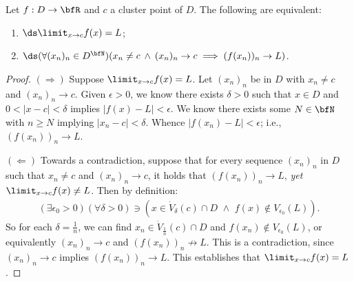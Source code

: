     \begin{proposition}\label{prop:seq-char-of-lim}
        Let $f:D \rightarrow \bfR$ and $c$ a cluster point of $D$. The following are equivalent:
            \begin{enumerate}[label = (\arabic*)]
                \item $\ds \limit_{x \rightarrow c}f(x) = L$;
                \item $\ds (\forall (x_n)_n \in D^\bfN)(x_n \neq c \hspace{2pt}\land\hspace{2pt}(x_n)_n \rightarrow c \implies (f(x_n))_n \rightarrow L)$.
            \end{enumerate}
    \end{proposition}
        \begin{proof}
            $(\Rightarrow)$ Suppose $\limit_{x \rightarrow c}f(x) = L$. Let $(x_n)_n$ be in $D$ with $x_n \neq c$ and $(x_n)_n \rightarrow c$. Given $\epsilon > 0$, we know there exists $\delta > 0$ such that $x \in D$ and $0 < |x-c| < \delta$ implies $|f(x)-L| < \epsilon$. We know there exists some $N \in \bfN$ with $n\geq N$ implying $|x_n - c| < \delta$. Whence $|f(x_n) - L| < \epsilon$; i.e., $(f(x_n))_n \rightarrow L$. \nl

            $(\Leftarrow)$ Towards a contradiction, suppose that for every sequence $(x_n)_n$ in $D$ such that $x_n \neq c$ and $(x_n)_n \rightarrow c$, it holds that $(f(x_n))_n \rightarrow L$, \textit{yet} $\limit_{x \rightarrow c}f(x) \neq L$. Then by definition:
                \begin{equation*}
                \begin{split}
                    (\exists \epsilon_0 > 0)(\forall \delta >0) \ni (x \in \dot{V}_\delta(c)\cap D \hspace{4pt}\land\hspace{4pt} f(x) \not\in V_{\epsilon_0}(L)).
                \end{split}
                \end{equation*}
            So for each $\delta = \frac{1}{n}$, we can find $x_n \in \dot{V}_{\frac{1}{n}}(c) \cap D$ and $f(x_n) \not\in V_{\epsilon_0}(L)$, or equivalently $(x_n)_n \rightarrow c$ and $(f(x_n))_n \not\rightarrow L$. This is a contradiction, since $(x_n)_n \rightarrow c$ implies $(f(x_n))_n \rightarrow L$. This establishes that $\limit_{x \rightarrow c}f(x) = L$.
        \end{proof}

